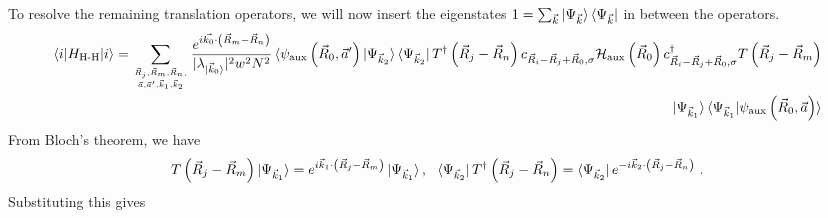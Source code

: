 \documentclass{report}
\numberwithin{equation}{section}
\begin{document}
To resolve the remaining translation operators, we will now insert the eigenstates \(1 = \sum_{\vec k}\ket{\Psi_{\vec k}}\bra{\Psi_{\vec k}}\) in between the operators.
\begin{equation}\begin{aligned}
	\braket{i | H_\text{H-H} | i} = \sum_{\vec R_j, \vec R_m, \vec R_n, \atop{\vec a, \vec a^\prime, \vec k_1, \vec k_2}} \frac{e^{i\vec{k_0}\cdot\left(\vec{R}_m - \vec R_n\right)}}{|\lambda_{\ket{\vec k_0}}|^2 w^2 N^2} \braket{\psi_\text{aux}\left( \vec R_0, \vec a^\prime \right) | \Psi_{\vec k_2}}\bra{\Psi_{\vec k_2}}T^\dagger\left(\vec R_j - \vec R_n\right) c_{\vec R_i - \vec R_j + \vec R_0,\sigma}\mathcal{H}_\text{aux}\left( \vec R_0 \right)c^\dagger_{\vec R_i - \vec R_j + \vec R_0,\sigma} T\left(\vec R_j - \vec R_m\right)\\
	\ket{\Psi_{\vec k_1}}\braket{\Psi_{\vec k_1} | \psi_\text{aux}\left( \vec R_0, \vec a \right)}
\end{aligned}\end{equation}
From Bloch's theorem, we have
\begin{equation}\begin{aligned}
T\left(\vec R_j - \vec R_m\right)\ket{\Psi_{\vec k_1}} = e^{i \vec{k}_1\cdot\left(\vec{R}_j - \vec R_m\right)}\ket{\Psi_{\vec k_1}}, ~ ~\bra{\Psi_{\vec k_2}}T^\dagger\left(\vec R_j - \vec R_n\right) = \bra{\Psi_{\vec k_2}}e^{-i \vec{k}_2\cdot\left(\vec{R}_j - \vec R_n\right)}~.
\end{aligned}\end{equation}
 Substituting this gives
\end{document}
